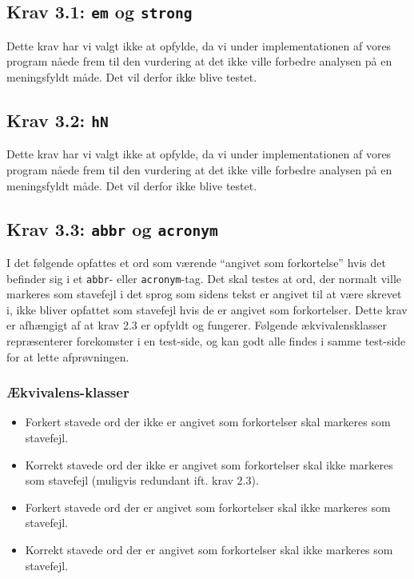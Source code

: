 \documentclass[a4paper,oneside,article]{memoir}
\begin{document}
\subsection{Krav 3.1: \texttt{em} og \texttt{strong}}

Dette krav har vi valgt ikke at opfylde, da vi under implementationen
af vores program nåede frem til den vurdering at det ikke ville
forbedre analysen på en meningsfyldt måde. Det vil derfor ikke blive
testet.

\subsection{Krav 3.2: \texttt{hN}}

Dette krav har vi valgt ikke at opfylde, da vi under implementationen
af vores program nåede frem til den vurdering at det ikke ville
forbedre analysen på en meningsfyldt måde. Det vil derfor ikke blive
testet.

\subsection{Krav 3.3: \texttt{abbr} og \texttt{acronym}}

I det følgende opfattes et ord som værende ``angivet som forkortelse''
hvis det befinder sig i et \texttt{abbr}- eller
\texttt{acronym}-tag. Det skal testes at ord, der normalt ville
markeres som stavefejl i det sprog som sidens tekst er angivet til at
være skrevet i, ikke bliver opfattet som stavefejl hvis de er angivet
som forkortelser. Dette krav er afhængigt af at krav 2.3 er opfyldt og
fungerer. Følgende ækvivalensklasser repræsenterer forekomster i en
test-side, og kan godt alle findes i samme test-side for at lette
afprøvningen.

\subsubsection{Ækvivalens-klasser}
\begin{itemize}
\item Forkert stavede ord der ikke er angivet som forkortelser skal
  markeres som stavefejl.
\item Korrekt stavede ord der ikke er angivet som forkortelser skal
  ikke markeres som stavefejl (muligvis redundant ift. krav 2.3).
\item Forkert stavede ord der er angivet som forkortelser skal ikke
  markeres som stavefejl.
\item Korrekt stavede ord der er angivet som forkortelser skal ikke
  markeres som stavefejl.
\end{itemize}
\end{document}
